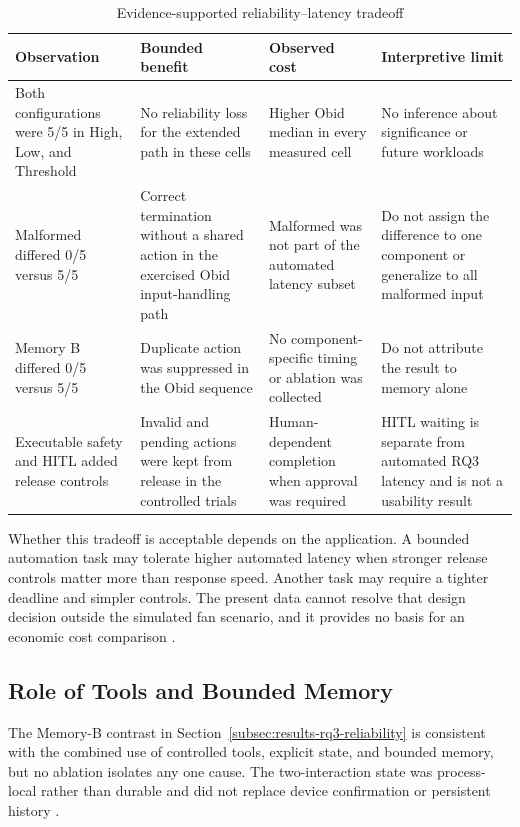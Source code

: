 \begin{table}[htbp]
\centering
\caption{Evidence-supported reliability--latency tradeoff}
\label{tab:discussion-tradeoff}
\small
\begin{tabularx}{\textwidth}{L{0.20\textwidth}L{0.24\textwidth}L{0.23\textwidth}Y}
\toprule
\textbf{Observation} & \textbf{Bounded benefit} & \textbf{Observed cost} &
\textbf{Interpretive limit} \\
\midrule
Both configurations were 5/5 in High, Low, and Threshold & No reliability loss
for the extended path in these cells & Higher Obid median in every measured cell
& No inference about significance or future workloads \\
Malformed differed 0/5 versus 5/5 & Correct termination without a shared action
in the exercised Obid input-handling path & Malformed was not part of the
automated latency subset & Do not
assign the difference to one component or generalize to all malformed input \\
Memory B differed 0/5 versus 5/5 & Duplicate action was suppressed in the Obid
sequence & No component-specific timing or ablation was collected & Do not
attribute the result to memory alone \\
Executable safety and HITL added release controls & Invalid and pending actions
were kept from release in the controlled trials & Human-dependent completion
when approval was required & HITL waiting is separate from automated RQ3
latency and is not a usability result \\
\bottomrule
\end{tabularx}
\end{table}

Whether this tradeoff is acceptable depends on the application. A bounded
automation task may tolerate higher automated latency when stronger release
controls matter more than response speed. Another task may require a tighter
deadline and simpler controls. The present data cannot
resolve that design decision outside the simulated fan scenario, and it provides
no basis for an economic cost comparison
\cite{kapoor2025agentsmatter}.

\subsection{Role of Tools and Bounded Memory}\label{subsec:discussion-tools-memory}

The Memory-B contrast in Section~\ref{subsec:results-rq3-reliability} is
consistent with the combined use of controlled tools, explicit state, and
bounded memory, but no ablation isolates any one cause. The two-interaction
state was process-local rather than durable and did not replace device
confirmation or persistent history
\cite{yao2023react,wang2024surveyagents,liu2024lostmiddle}.

